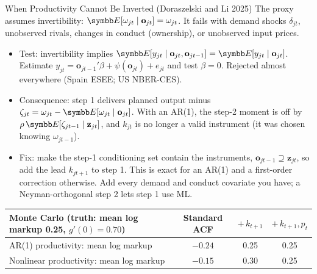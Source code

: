 \documentclass[aspectratio=169,10pt]{beamer}
\begin{document}
\begin{frame}{When Productivity Cannot Be Inverted (Doraszelski and Li 2025)}
\small
The proxy assumes \alert{invertibility}: $\E[\omega_{jt} \mid \mathbf{o}_{jt}] = \omega_{jt}$. It fails with demand shocks $\delta_{jt}$, unobserved rivals, changes in conduct (ownership), or unobserved input prices.
\begin{itemize}
\item \alert{Test}: invertibility implies $\E[y_{jt} \mid \mathbf{o}_{jt}, \mathbf{o}_{jt-1}] = \E[y_{jt} \mid \mathbf{o}_{jt}]$. Estimate $y_{jt} = \mathbf{o}_{jt-1}'\beta + \psi(\mathbf{o}_{jt}) + e_{jt}$ and test $\beta = 0$. Rejected almost everywhere (Spain ESEE; US NBER-CES).
\item \alert{Consequence}: step 1 delivers planned output minus $\zeta_{jt} = \omega_{jt} - \E[\omega_{jt} \mid \mathbf{o}_{jt}]$. With an AR(1), the step-2 moment is off by $\rho\, \E[\zeta_{jt-1} \mid \mathbf{z}_{jt}]$, and \alert{$k_{jt}$ is no longer a valid instrument} (it was chosen knowing $\omega_{jt-1}$).
\item \alert{Fix}: make the step-1 conditioning set contain the instruments, $\mathbf{o}_{jt-1} \supseteq \mathbf{z}_{jt}$, so add the lead $k_{jt+1}$ to step 1. This is exact for an AR(1) and a first-order correction otherwise. Add every demand and conduct covariate you have; a Neyman-orthogonal step 2 lets step 1 use ML.
\end{itemize}
\begin{center}
\scriptsize
\renewcommand{\arraystretch}{1.1}
\begin{tabular}{lccc}
\toprule
Monte Carlo (truth: mean log markup 0.25, $g'(0) = 0.70$) & Standard ACF & $+\,k_{t+1}$ & $+\,k_{t+1}, p_t$ \\
\midrule
AR(1) productivity: mean log markup & $-0.24$ & 0.25 & 0.25 \\
Nonlinear productivity: mean log markup & $-0.15$ & 0.30 & 0.25 \\
\bottomrule
\end{tabular}
\end{center}
\end{frame}
\end{document}
